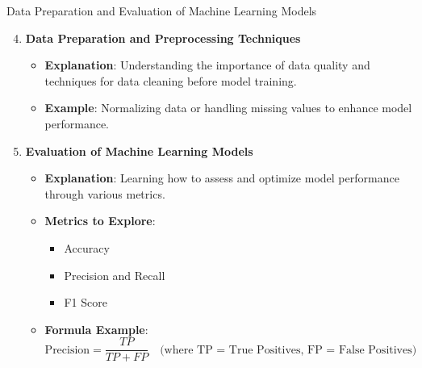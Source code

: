 \documentclass[aspectratio=169]{beamer}
\begin{document}
\begin{frame}[fragile]{Data Preparation and Evaluation of Machine Learning Models}
    \begin{enumerate}
        \setcounter{enumi}{3}
        \item \textbf{Data Preparation and Preprocessing Techniques}
            \begin{itemize}
                \item \textbf{Explanation}: Understanding the importance of data quality and techniques for data cleaning before model training.
                \item \textbf{Example}: Normalizing data or handling missing values to enhance model performance.
            \end{itemize}

        \item \textbf{Evaluation of Machine Learning Models}
            \begin{itemize}
                \item \textbf{Explanation}: Learning how to assess and optimize model performance through various metrics.
                \item \textbf{Metrics to Explore}: 
                \begin{itemize}
                    \item Accuracy
                    \item Precision and Recall
                    \item F1 Score
                \end{itemize}
                \item \textbf{Formula Example}: 
                \begin{equation}
                    \text{Precision} = \frac{TP}{TP + FP} \quad \text{(where TP = True Positives, FP = False Positives)}
                \end{equation}
            \end{itemize}
    \end{enumerate}
\end{frame}
\end{document}
